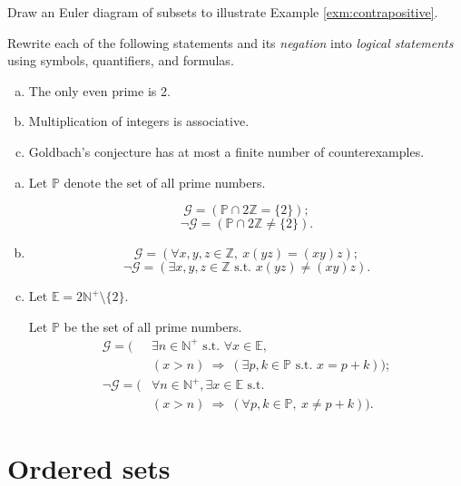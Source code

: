 \begin{exc}
  Draw an Euler diagram of subsets to illustrate Example \ref{exm:contrapositive}.
\end{exc}

\begin{exc}
  Rewrite each of the following
  statements and its \emph{negation}
  into \emph{logical statements}
  using symbols, quantifiers, and formulas.
  \begin{enumerate}[(a)]\itemsep0em
  \item The only even prime is 2.
  \item Multiplication of integers is associative.
  \item Goldbach's conjecture has
    at most a finite number of counterexamples.
  \end{enumerate}  
\end{exc}
\begin{solution}
\begin{enumerate}[(a)]
\item Let $\mathbb{P}$ denote the set of all prime numbers.

\[
\mathcal{G}=(\mathbb{P}\cap 2\mathbb{Z}=\{2\});
\]
\[
\neg\mathcal{G}=(\mathbb{P}\cap 2\mathbb{Z}\ne\{2\}).
\]

\item\[
\mathcal{G}=(\forall x,y,z \in \mathbb{Z},\  x(yz)=(xy)z);
\]
\[
\neg\mathcal{G}=(\exists x,y,z \in \mathbb{Z}\text{ s.t. } x(yz)\neq(xy)z).
\]
\item Let $\mathbb{E}= 2\mathbb{N^+}\setminus \{2\}$.

Let $\mathbb{P}$ be the set of all prime numbers.
\begin{align*}
\mathcal{G} =\bigl(&\exists n\in\mathbb{N}^+\text{ s.t. }
 \forall x\in\mathbb{E},\\  
 &(x>n)\ \Rightarrow\ (\exists p,k\in\mathbb{P}\text{ s.t. } x= p+k)
 \bigr);  \\
\neg\mathcal{G} =\bigl(&\forall n\in\mathbb{N}^+,
 \exists x\in\mathbb{E}\text{ s.t. } \\
 &(x>n)\ \Rightarrow\ (\forall p,k\in\mathbb{P},\  x\ne p+k)
 \bigr).
\end{align*}
\end{enumerate}
\end{solution}

\section{Ordered sets}
\label{sec:sets}

